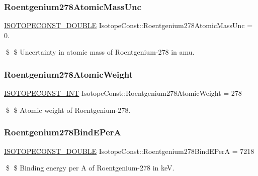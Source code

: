 \subsubsection{\texorpdfstring{Roentgenium278\+Atomic\+Mass\+Unc}{Roentgenium278AtomicMassUnc}}
{\footnotesize\ttfamily \mbox{\hyperlink{group___isotope_const-_macros_ga8f45a7272ce02c0b4c65c44636ed719a}{I\+S\+O\+T\+O\+P\+E\+C\+O\+N\+S\+T\+\_\+\+D\+O\+U\+B\+LE}} Isotope\+Const\+::\+Roentgenium278\+Atomic\+Mass\+Unc = 0.}

\$ \$ Uncertainty in atomic mass of Roentgenium-\/278 in amu. \mbox{\label{group___isotope_const-_roentgenium-_rg278_ga450fa08d41155e8f1bc1a51912fa9b0b}} 
\subsubsection{\texorpdfstring{Roentgenium278\+Atomic\+Weight}{Roentgenium278AtomicWeight}}
{\footnotesize\ttfamily \mbox{\hyperlink{group___isotope_const-_macros_ga5f18360b3e99483a35c32d789e62621c}{I\+S\+O\+T\+O\+P\+E\+C\+O\+N\+S\+T\+\_\+\+I\+NT}} Isotope\+Const\+::\+Roentgenium278\+Atomic\+Weight = 278}

\$ \$ Atomic weight of Roentgenium-\/278. \mbox{\label{group___isotope_const-_roentgenium-_rg278_gae20d0a64ee32c129d4573fe91f743e0e}} 
\subsubsection{\texorpdfstring{Roentgenium278\+Bind\+E\+PerA}{Roentgenium278BindEPerA}}
{\footnotesize\ttfamily \mbox{\hyperlink{group___isotope_const-_macros_ga8f45a7272ce02c0b4c65c44636ed719a}{I\+S\+O\+T\+O\+P\+E\+C\+O\+N\+S\+T\+\_\+\+D\+O\+U\+B\+LE}} Isotope\+Const\+::\+Roentgenium278\+Bind\+E\+PerA = 7218}

\$ \$ Binding energy per A of Roentgenium-\/278 in keV. \mbox{\label{group___isotope_const-_roentgenium-_rg278_ga876895ed6432f9e898c066abfc0337ac}} 
